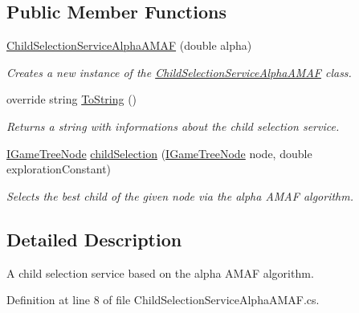 \subsection*{Public Member Functions}
\begin{DoxyCompactItemize}
\item 
\mbox{\hyperlink{class_game_tree_core_1_1_child_selection_service_alpha_a_m_a_f_a0066b042bfcf03ce6f48bb0e2c2f686c}{Child\+Selection\+Service\+Alpha\+A\+M\+AF}} (double alpha)
\begin{DoxyCompactList}\small\item\em Creates a new instance of the \mbox{\hyperlink{class_game_tree_core_1_1_child_selection_service_alpha_a_m_a_f}{Child\+Selection\+Service\+Alpha\+A\+M\+AF}} class. \end{DoxyCompactList}\item 
override string \mbox{\hyperlink{class_game_tree_core_1_1_child_selection_service_alpha_a_m_a_f_a363afde50466810de65b08e58b96be8d}{To\+String}} ()
\begin{DoxyCompactList}\small\item\em Returns a string with informations about the child selection service. \end{DoxyCompactList}\item 
\mbox{\hyperlink{interface_game_tree_core_1_1_i_game_tree_node}{I\+Game\+Tree\+Node}} \mbox{\hyperlink{class_game_tree_core_1_1_child_selection_service_alpha_a_m_a_f_af0d4f97cb4f3ba63de5985c899f1ab3d}{child\+Selection}} (\mbox{\hyperlink{interface_game_tree_core_1_1_i_game_tree_node}{I\+Game\+Tree\+Node}} node, double exploration\+Constant)
\begin{DoxyCompactList}\small\item\em Selects the best child of the given node via the alpha A\+M\+AF algorithm. \end{DoxyCompactList}\end{DoxyCompactItemize}


\subsection{Detailed Description}
A child selection service based on the alpha A\+M\+AF algorithm. 



Definition at line 8 of file Child\+Selection\+Service\+Alpha\+A\+M\+A\+F.\+cs.



